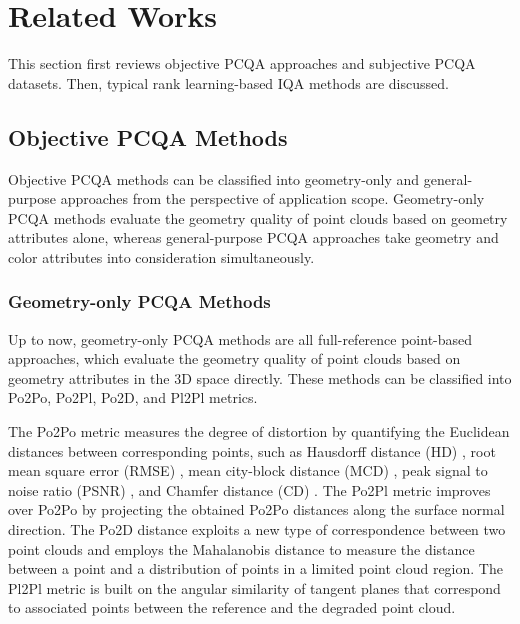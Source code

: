 \section{Related Works}
\label{sec:Related Works}

This section first reviews objective PCQA approaches and subjective PCQA datasets.
Then, typical rank learning-based IQA methods are discussed.

\subsection{Objective PCQA Methods}
\label{subsec:spcqa}

Objective PCQA methods \citep{liuq22,oufz21} can be classified into geometry-only and general-purpose approaches from the perspective of application scope.
Geometry-only PCQA methods evaluate the geometry quality of point clouds based on geometry attributes alone, whereas general-purpose PCQA approaches take geometry and color attributes into consideration simultaneously.

\subsubsection{Geometry-only PCQA Methods}
\label{subsec:fr_method_details}
Up to now, geometry-only PCQA methods  \citep{Alexioue18,Dumice18,Meynetg20,Yangq22,Dinizr21,liuq22} are all full-reference point-based approaches, which evaluate the geometry quality of point clouds based on geometry attributes in the 3D space directly.
These methods can be classified into Po2Po, Po2Pl, Po2D, and Pl2Pl metrics.

The Po2Po metric measures the degree of distortion by quantifying the Euclidean distances between corresponding points, such as Hausdorff distance (HD) \citep{Lavoueg10}, root mean square error (RMSE) \citep{Javaheria17a}, mean city-block distance (MCD) \citep{Zengj20}, peak signal to noise ratio (PSNR) \citep{Tiand17}, and Chamfer distance (CD) \citep{Zhangdb21}.
The Po2Pl metric \citep{Tiand17} improves over Po2Po by projecting the obtained Po2Po distances along the surface normal direction.%
The Po2D \citep{Javaheria20a} distance exploits a new type of correspondence between two point clouds and employs the Mahalanobis distance to measure the distance between a point and a distribution of points in a limited point cloud region.
The Pl2Pl metric \citep{Alexioue18icme} is built on the angular similarity of tangent planes that correspond to associated points between the reference and the degraded point cloud.

